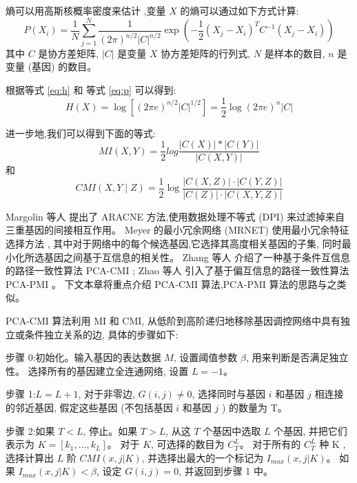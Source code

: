 熵可以用高斯核概率密度来估计 ,变量 $X$ 的熵可以通过如下方式计算:
\begin{equation}
  \label{eq:p}
P\left(X_{i}\right)=\frac{1}{N} \sum_{j=1}^{N} \frac{1}{(2 \pi)^{n / 2}|C|^{n / 2}} \exp \left(-\frac{1}{2}\left(X_{j}-X_{i}\right)^{T} C^{-1}\left(X_{j}-X_{i}\right)\right)
\end{equation}
其中 $C$ 是协方差矩阵, $|C|$ 是变量 $X$ 协方差矩阵的行列式, $N$ 是样本的数目, $n$ 是变量 (基因) 的数目。

根据等式 \ref{eq:h} 和 等式 \ref{eq:p} 可以得到:
\begin{equation}
  H(X)=\log \left[(2 \pi e)^{n / 2}|C|^{1 / 2}\right]=\frac{1}{2} \log (2 \pi e)^{n}|C| 
\end{equation}

进一步地,我们可以得到下面的等式:
\begin{equation}
    MI(X,Y)=\frac{1}{2}log\frac{|C(X)|*|C(Y)|}{|C(X,Y)|}
\end{equation}
和
\begin{equation}
  CMI(X, Y \mid Z)=\frac{1}{2} \log \frac{|C(X, Z)| \cdot|C(Y, Z)|}{|C(Z)| \cdot|C(X, Y, Z)|}
\end{equation}

Margolin 等人 提出了 ARACNE 方法,使用数据处理不等式 (DPI) 来过滤掉来自三重基因的间接相互作用。
Meyer  的最小冗余网络 (MRNET) 使用最小冗余特征选择方法 ,
其中对于网络中的每个候选基因,它选择其高度相关基因的子集, 同时最小化所选基因之间基于互信息的相关性。
Zhang 等人  介绍了一种基于条件互信息的路径一致性算法 PCA-CMI ; 
Zhao 等人  引入了基于偏互信息的路径一致性算法 PCA-PMI 。
下文本章将重点介绍 PCA-CMI 算法,PCA-PMI 算法的思路与之类似。

PCA-CMI 算法利用 MI 和 CMI, 从低阶到高阶递归地移除基因调控网络中具有独立或条件独立关系的边, 具体的步骤如下:

步骤 0:初始化。输入基因的表达数据 $M$, 设置阈值参数 $\beta$, 用来判断是否满足独立性。
选择所有的基因建立全连通网络, 设置 $L=-1$。

步骤 1:$L=L+1$, 对于非零边, $G(i,j) \neq 0$, 选择同时与基因 $i$ 和基因 $j$ 相连接的邻近基因, 
假定这些基因 (不包括基因 $i$ 和基因 $j$ ) 的数量为 T。

步骤 2:如果 $T<L$, 停止。如果 $T>L$, 从这 $T$ 个基因中选取 $L$ 个基因, 
并把它们表示为 $K=[k_1,\ldots,k_L]$。
对于 $K$, 可选择的数目为 $C_T^L$。
对于所有的 $C_T^L$ 种 K ,选择计算出 $L$ 阶 $CMI(x,j|K)$,
并选择出最大的一个标记为 $I_{max}(x,j|K)$。
如果 $I_{max}(x,j|K) < \beta$, 设定 $G(i,j)=0$, 并返回到步骤 1 中。

